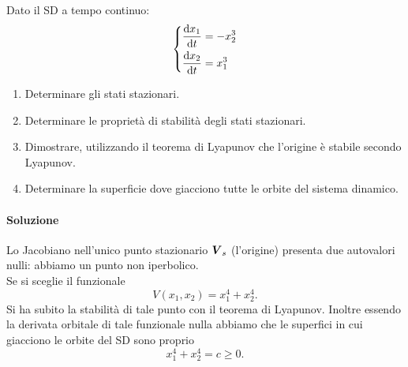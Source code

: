 \begin{ex}[]
    Dato il SD a tempo continuo:
    \[
    \begin{dcases}
    \frac{\text{d} x_1}{\text{d} t} = -x_2^3\\
    \frac{\text{d} x_2}{\text{d} t} = x_1^3
    \end{dcases}
    \]
    \begin{enumerate}
        \item Determinare gli stati stazionari.
	\item Determinare le proprietà di stabilità degli stati stazionari.
	\item Dimostrare, utilizzando il teorema di Lyapunov che l'origine è stabile secondo Lyapunov.
	\item Determinare la superficie dove giacciono tutte le orbite del sistema dinamico.
    \end{enumerate}
\end{ex}
\noindent
\paragraph{Soluzione}%
Lo Jacobiano nell'unico punto stazionario $\boldsymbol{V}_{s}$ (l'origine) presenta due autovalori nulli: abbiamo un punto non iperbolico.\\
Se si sceglie il funzionale
\[
    V(x_1,x_2) = x_1^4 + x_2^4
.\] 
Si ha subito la stabilità di tale punto con il teorema di Lyapunov. Inoltre essendo la derivata orbitale di tale funzionale nulla abbiamo che le superfici in cui giacciono le orbite del SD sono proprio
\[
    x_1^4 + x_2^4 = c \ge 0
.\] 
